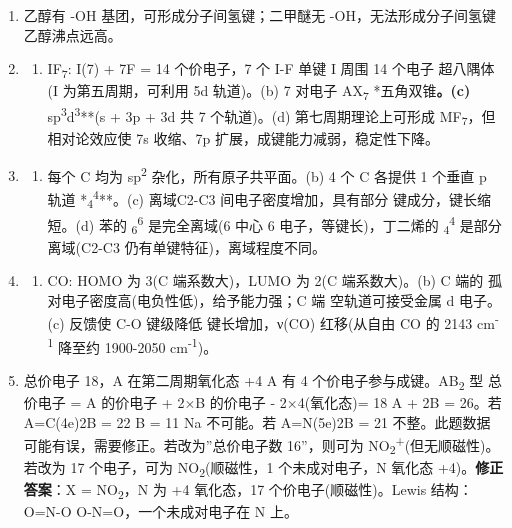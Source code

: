 \begin{enumerate}
\begin{enumerate}
  \def\labelenumii{(\alph{enumii})}
  \tightlist
  \item
    HF 有氢键，HCl 无氢键 \箭 HF 沸点反常高。(b) 冰中每个水分子通过氢键与 4 个相邻水分子形成四面体排列，体积膨胀 \箭 密度小于液态水。
  \end{enumerate}
\item
  乙醇有 -OH 基团，可形成分子间氢键；二甲醚无 -OH，无法形成分子间氢键 \箭 乙醇沸点远高。
\item
  \begin{enumerate}
  \def\labelenumii{(\alph{enumii})}
  \tightlist
  \item
    IF\textsubscript{7}: I(7) + 7F = 14 个价电子，7 个 I-F 单键 \箭 I 周围 14 个电子 \箭 超八隅体(I 为第五周期，可利用 5d 轨道)。(b) 7 对电子 \箭 AX\textsubscript{7} \箭 **五角双锥\textbf{。(c) }sp\textsuperscript{3}d\textsuperscript{3}**(s + 3p + 3d 共 7 个轨道)。(d) 第七周期理论上可形成 MF\textsubscript{7}，但相对论效应使 7s 收缩、7p 扩展，成键能力减弱，稳定性下降。
  \end{enumerate}
\item
  \begin{enumerate}
  \def\labelenumii{(\alph{enumii})}
  \tightlist
  \item
    每个 C 均为 sp\textsuperscript{2} 杂化，所有原子共平面。(b) 4 个 C 各提供 1 个垂直 p 轨道 \箭 **\派\textsubscript{4}\textsuperscript{4}**。(c) 离域 C2-C3 间电子密度增加，具有部分 \派 键成分，键长缩短。(d) 苯的 \派\textsubscript{6}\textsuperscript{6} 是完全离域(6 中心 6 电子，等键长)，丁二烯的 \派\textsubscript{4}\textsuperscript{4} 是部分离域(C2-C3 仍有单键特征)，离域程度不同。
  \end{enumerate}
\item
  \begin{enumerate}
  \def\labelenumii{(\alph{enumii})}
  \tightlist
  \item
    CO: HOMO 为 3(C 端系数大)，LUMO 为 2\派*(C 端系数大)。(b) C 端的  孤对电子密度高(电负性低)，给予能力强；C 端 \派* 空轨道可接受金属 d 电子。(c) \派 反馈使 C-O 键级降低 \箭 键长增加，ν(CO) 红移(从自由 CO 的 2143 cm\textsuperscript{-1} 降至约 1900-2050 cm\textsuperscript{-1})。
  \end{enumerate}
\item
  总价电子 18，A 在第二周期氧化态 +4 \箭 A 有 4 个价电子参与成键。AB\textsubscript{2} 型 \箭 总价电子 = A 的价电子 + 2×B 的价电子 - 2×4(氧化态)= 18 \箭 A + 2B = 26。若 A=C(4e)\箭 2B = 22 \箭 B = 11 \箭 Na 不可能。若 A=N(5e)\箭 2B = 21 \箭 不整。此题数据可能有误，需要修正。若改为''总价电子数 16''，则可为 NO\textsubscript{2}\textsuperscript{+}(但无顺磁性)。若改为 17 个电子，可为 NO\textsubscript{2}(顺磁性，1 个未成对电子，N 氧化态 +4)。\textbf{修正答案}：X = NO\textsubscript{2}，N 为 +4 氧化态，17 个价电子(顺磁性)。Lewis 结构：O=N-O  O-N=O，一个未成对电子在 N 上。

\end{enumerate}

